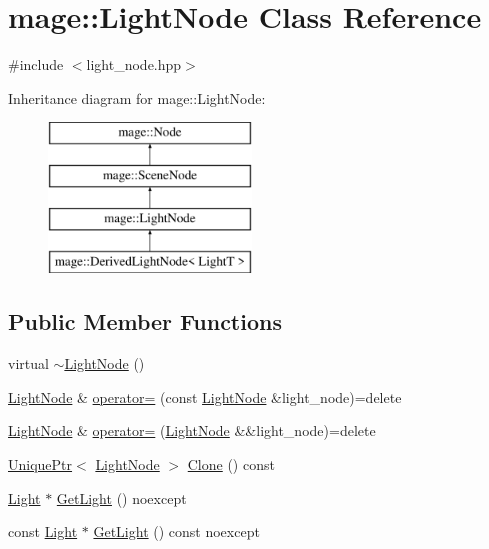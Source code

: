 \hypertarget{classmage_1_1_light_node}{}\section{mage\+:\+:Light\+Node Class Reference}
\label{classmage_1_1_light_node}


{\ttfamily \#include $<$light\+\_\+node.\+hpp$>$}

Inheritance diagram for mage\+:\+:Light\+Node\+:\begin{figure}[H]
\begin{center}
\leavevmode
\includegraphics[height=4.000000cm]{classmage_1_1_light_node}
\end{center}
\end{figure}
\subsection*{Public Member Functions}
\begin{DoxyCompactItemize}
\item 
virtual \hyperlink{classmage_1_1_light_node_ad0c650ac0059589c28a3d1cfec95c07d}{$\sim$\+Light\+Node} ()
\item 
\hyperlink{classmage_1_1_light_node}{Light\+Node} \& \hyperlink{classmage_1_1_light_node_a41e3ee25215ccc1cbaed4b73e393930a}{operator=} (const \hyperlink{classmage_1_1_light_node}{Light\+Node} \&light\+\_\+node)=delete
\item 
\hyperlink{classmage_1_1_light_node}{Light\+Node} \& \hyperlink{classmage_1_1_light_node_abda92f7cf2ce3aed3af94d2278e2bfa1}{operator=} (\hyperlink{classmage_1_1_light_node}{Light\+Node} \&\&light\+\_\+node)=delete
\item 
\hyperlink{namespacemage_a8c307fbcc33bce9b7f2aa4c26c3b95cf}{Unique\+Ptr}$<$ \hyperlink{classmage_1_1_light_node}{Light\+Node} $>$ \hyperlink{classmage_1_1_light_node_a4d0c10f03de71cd497635feb431d02d5}{Clone} () const
\item 
\hyperlink{classmage_1_1_light}{Light} $\ast$ \hyperlink{classmage_1_1_light_node_a2b971e64ec2267d49c2ba96a00662d3b}{Get\+Light} () noexcept
\item 
const \hyperlink{classmage_1_1_light}{Light} $\ast$ \hyperlink{classmage_1_1_light_node_a015453d1751cf3ad78846e972957bb5b}{Get\+Light} () const noexcept
\end{DoxyCompactItemize}
